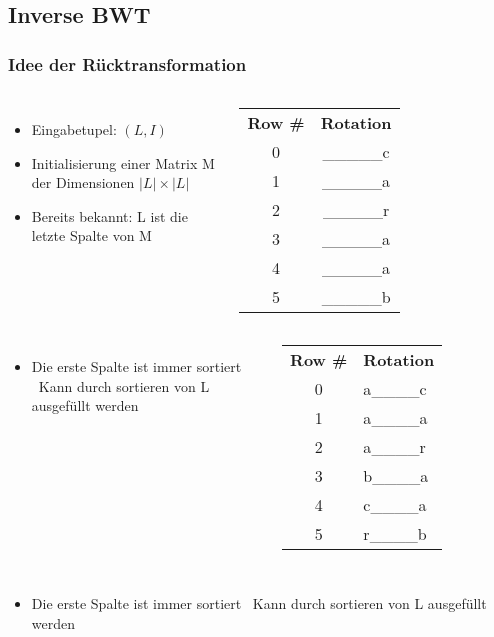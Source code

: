 \documentclass[14pt,xcolor=dvipsnames]{beamer}
\begin{document}
\subsection{Inverse BWT}
\begin{frame}[allowframebreaks]
\frametitle{Idee der Rücktransformation}
\begin{columns}[c,onlytextwidth]
 \begin{itemize}
  \item Eingabetupel: $(L,I)$
  \item Initialisierung einer Matrix M der Dimensionen $|L| \times |L|$
  \item Bereits bekannt: L ist die {\color{darkgreen}letzte Spalte} von M
 \end{itemize}
    \begin{tabular}{c|c}
    \textbf{Row \#} & \textbf{Rotation} \\
    0 & \_\_\_\_\_{\color{darkgreen}c} \\
    1 & \_\_\_\_\_{\color{darkgreen}a} \\
    2 & \_\_\_\_\_{\color{darkgreen}r} \\
    3 & \_\_\_\_\_{\color{darkgreen}a} \\
    4 & \_\_\_\_\_{\color{darkgreen}a} \\
    5 & \_\_\_\_\_{\color{darkgreen}b} \\
    \end{tabular}
\end{columns}
\framebreak
\begin{columns}[c,onlytextwidth]
 \begin{itemize}
  \item Die {\color{darkgreen}erste Spalte} ist immer sortiert
  \textrightarrow\ Kann durch sortieren von L ausgefüllt werden
 \end{itemize}

    \begin{tabular}{c|l}
    \textbf{Row \#} & \textbf{Rotation} \\
    0 & {\color{darkgreen}a}\_\_\_\_c\\
    1 & {\color{darkgreen}a}\_\_\_\_a\\
    2 & {\color{darkgreen}a}\_\_\_\_r\\
    3 & {\color{darkgreen}b}\_\_\_\_a\\
    4 & {\color{darkgreen}c}\_\_\_\_a\\
    5 & {\color{darkgreen}r}\_\_\_\_b\\
    \end{tabular}
\end{columns}
\framebreak
\begin{columns}[c,onlytextwidth]
 \begin{itemize}
  \item Die {\color{darkgreen}erste Spalte} ist immer sortiert
  \textrightarrow\ Kann durch sortieren von L ausgefüllt werden
 \end{itemize}


\end{columns}
\end{frame}
\end{document}
